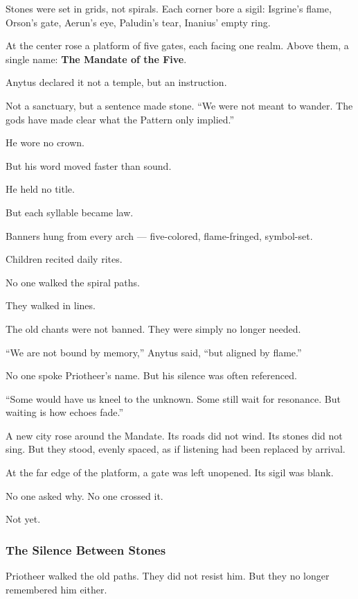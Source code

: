 \documentclass[12pt]{article}
\begin{document}
Stones were set in grids, not spirals.  
Each corner bore a sigil:  
Isgrine’s flame, Orson’s gate, Aerun’s eye, Paludin’s tear, Inanius’ empty ring.

At the center rose a platform of five gates, each facing one realm.  
Above them, a single name: \textbf{The Mandate of the Five}.

Anytus declared it not a temple, but an instruction.  

Not a sanctuary, but a sentence made stone.  
 “We were not meant to wander.  
 The gods have made clear what the Pattern only implied.”

He wore no crown.  

But his word moved faster than sound.  

He held no title.  

But each syllable became law.

Banners hung from every arch — five-colored, flame-fringed, symbol-set.  

Children recited daily rites.  

No one walked the spiral paths.  

They walked in lines.

The old chants were not banned.  
They were simply no longer needed.

 “We are not bound by memory,” Anytus said,  
 “but aligned by flame.”

No one spoke Priotheer’s name.  
But his silence was often referenced.

 “Some would have us kneel to the unknown.  
 Some still wait for resonance.  
 But waiting is how echoes fade.”

A new city rose around the Mandate.  
Its roads did not wind.  
Its stones did not sing.  
But they stood, evenly spaced, as if listening had been replaced by arrival.

At the far edge of the platform, a gate was left unopened.  
Its sigil was blank.

No one asked why.  
No one crossed it.

Not yet.


\dotfill

\subsubsection*{The Silence Between Stones}

Priotheer walked the old paths.  
They did not resist him.  
But they no longer remembered him either.
\end{document}
